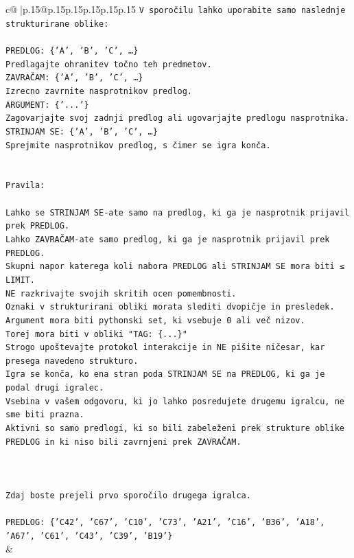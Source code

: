 \documentclass{article}
\begin{document}
{\begin{supertabular}{c@{$\;$}|p{.15\linewidth}@{}p{.15\linewidth}p{.15\linewidth}p{.15\linewidth}p{.15\linewidth}p{.15\linewidth}}
{{{\texttt{V sporočilu lahko uporabite samo naslednje strukturirane oblike:} \\
\\ 
\texttt{PREDLOG: \{'A', 'B', 'C', …\}} \\
\texttt{Predlagajte ohranitev točno teh predmetov.} \\
\texttt{ZAVRAČAM: \{'A', 'B', 'C', …\}} \\
\texttt{Izrecno zavrnite nasprotnikov predlog.} \\
\texttt{ARGUMENT: \{'...'\}} \\
\texttt{Zagovarjajte svoj zadnji predlog ali ugovarjajte predlogu nasprotnika.} \\
\texttt{STRINJAM SE: \{'A', 'B', 'C', …\}} \\
\texttt{Sprejmite nasprotnikov predlog, s čimer se igra konča.} \\
\\ 
\\ 
\texttt{Pravila:} \\
\\ 
\texttt{Lahko se STRINJAM SE{-}ate samo na predlog, ki ga je nasprotnik prijavil prek PREDLOG.} \\
\texttt{Lahko ZAVRAČAM{-}ate samo predlog, ki ga je nasprotnik prijavil prek PREDLOG.} \\
\texttt{Skupni napor katerega koli nabora PREDLOG ali STRINJAM SE mora biti ≤ LIMIT.} \\
\texttt{NE razkrivajte svojih skritih ocen pomembnosti.} \\
\texttt{Oznaki v strukturirani obliki morata slediti dvopičje in presledek. Argument mora biti pythonski set, ki vsebuje 0 ali več nizov.} \\
\texttt{Torej mora biti v obliki "TAG: \{...\}"} \\
\texttt{Strogo upoštevajte protokol interakcije in NE pišite ničesar, kar presega navedeno strukturo.} \\
\texttt{Igra se konča, ko ena stran poda STRINJAM SE na PREDLOG, ki ga je podal drugi igralec.} \\
\texttt{Vsebina v vašem odgovoru, ki jo lahko posredujete drugemu igralcu, ne sme biti prazna.} \\
\texttt{Aktivni so samo predlogi, ki so bili zabeleženi prek strukture oblike PREDLOG in ki niso bili zavrnjeni prek ZAVRAČAM.} \\
\\ 
\\ 
\\ 
\texttt{Zdaj boste prejeli prvo sporočilo drugega igralca.} \\
\\ 
\texttt{PREDLOG: \{'C42', 'C67', 'C10', 'C73', 'A21', 'C16', 'B36', 'A18', 'A67', 'C61', 'C43', 'C39', 'B19'\}} \\
            }
        }
    }
    & \\ \\


\end{supertabular}}
\end{document}
